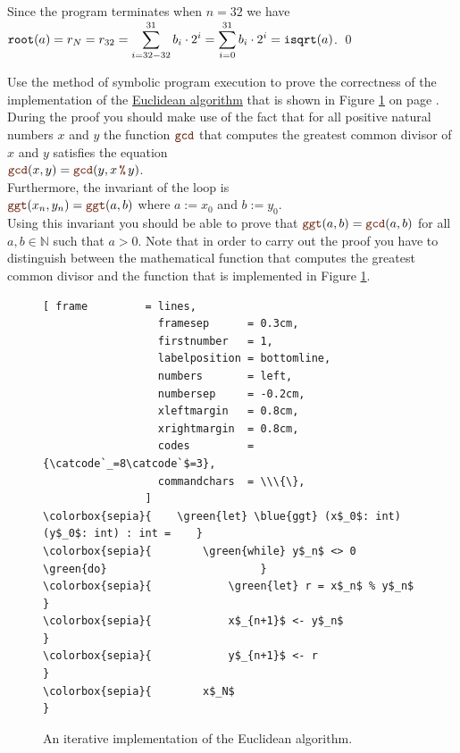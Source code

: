 Since the program terminates when $n=32$ we have
\\[0.2cm]
\hspace*{1.3cm}
$\displaystyle \mathtt{root}(a) = r_N = r_{32} = \sum\limits_{i=32-32}^{31} b_i \cdot 2^i = \sum\limits_{i=0}^{31} b_i \cdot 2^i = \mathtt{isqrt}(a)$. \qed
\pagebreak

\exerciseEng
Use the method of symbolic program execution to prove the correctness of the implementation of the
\href{https://en.wikipedia.org/wiki/Euclidean_algorithm}{Euclidean algorithm} that is shown in Figure
\ref{fig:gcd.stlx} on page \pageref{fig:gcd.stlx}.  During the proof 
you should make use of the fact that for all positive natural numbers $x$ and $y$ the function $\mytt{gcd}$
that computes the greatest common divisor of $x$ and $y$ satisfies the equation
\\[0.2cm]
\hspace*{1.3cm}
$\mytt{gcd}(x, y) = \mytt{gcd}(y, x \,\mytt{\%}\, y)$.
\\[0.2cm]
Furthermore, the invariant of the  loop is
\\[0.2cm]
\hspace*{1.3cm}
$\mytt{ggt}(x_n, y_n) = \mytt{ggt}(a, b)$ \quad where $a := x_0$ and $b := y_0$.
\\[0.2cm]
Using this invariant you should be able to prove that $\mytt{ggt}(a, b) = \mytt{gcd}(a, b)$ for all
$a, b \in \mathbb{N}$ such that $a > 0$.  Note that in order to carry out the proof you have to distinguish
between the mathematical function  that computes the greatest common divisor and the \Fsharp{}
function  that is implemented in Figure \ref{fig:gcd.stlx}.
\eox

\begin{figure}[!ht]
\centering
\begin{Verbatim}[ frame         = lines, 
                  framesep      = 0.3cm, 
                  firstnumber   = 1,
                  labelposition = bottomline,
                  numbers       = left,
                  numbersep     = -0.2cm,
                  xleftmargin   = 0.8cm,
                  xrightmargin  = 0.8cm,
                  codes         = {\catcode`_=8\catcode`$=3},
                  commandchars  = \\\{\},
                ]
\colorbox{sepia}{    \green{let} \blue{ggt} (x$_0$: int) (y$_0$: int) : int =    }
\colorbox{sepia}{        \green{while} y$_n$ <> 0 \green{do}                        }
\colorbox{sepia}{            \green{let} r = x$_n$ % y$_n$                    }
\colorbox{sepia}{            x$_{n+1}$ <- y$_n$                          }
\colorbox{sepia}{            y$_{n+1}$ <- r                           }
\colorbox{sepia}{        x$_N$                                     }
\end{Verbatim}
\vspace*{-0.3cm}
\caption{An iterative implementation of the Euclidean algorithm.}
\label{fig:gcd.stlx}
\end{figure}

